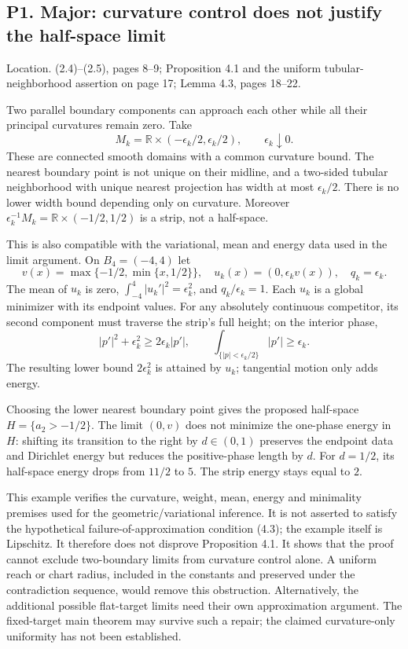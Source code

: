 \documentclass[10pt]{article}
\begin{document}
\subsection*{P1. Major: curvature control does not justify the half-space limit}
Location. (2.4)–(2.5), pages 8–9; Proposition 4.1 and the uniform tubular-neighborhood assertion on page 17; Lemma 4.3, pages 18–22.\par
Two parallel boundary components can approach each other while all their principal curvatures remain zero. Take \[M_k=\mathbb R\times(-\epsilon_k/2,\epsilon_k/2),\qquad
 \epsilon_k\downarrow0 .\] These are connected smooth domains with a common curvature bound. The nearest boundary point is not unique on their midline, and a two-sided tubular neighborhood with unique nearest projection has width at most \(\epsilon_k/2\). There is no lower width bound depending only on curvature. Moreover \(\epsilon_k^{-1}M_k=\mathbb R\times(-1/2,1/2)\) is a strip, not a half-space.\par
This is also compatible with the variational, mean and energy data used in the limit argument. On \(B_4=(-4,4)\) let \[v(x)=\max\{-1/2,\min\{x,1/2\}\},\quad
 u_k(x)=(0,\epsilon_k v(x)),\quad q_k=\epsilon_k .\] The mean of \(u_k\) is zero, \(\int_{-4}^4|u_k'|^2=\epsilon_k^2\), and \(q_k/\epsilon_k=1\). Each \(u_k\) is a global minimizer with its endpoint values. For any absolutely continuous competitor, its second component must traverse the strip’s full height; on the interior phase, \[|p'|^2+\epsilon_k^2\ge2\epsilon_k|p'|,
 \qquad
 \int_{\{|p|<\epsilon_k/2\}}|p'|\ge\epsilon_k .\] The resulting lower bound \(2\epsilon_k^2\) is attained by \(u_k\); tangential motion only adds energy.\par
Choosing the lower nearest boundary point gives the proposed half-space \(H=\{a_2>-1/2\}\). The limit \((0,v)\) does not minimize the one-phase energy in \(H\): shifting its transition to the right by \(d\in(0,1)\) preserves the endpoint data and Dirichlet energy but reduces the positive-phase length by \(d\). For \(d=1/2\), its half-space energy drops from \(11/2\) to \(5\). The strip energy stays equal to \(2\).\par
This example verifies the curvature, weight, mean, energy and minimality premises used for the geometric/variational inference. It is not asserted to satisfy the hypothetical failure-of-approximation condition (4.3); the example itself is Lipschitz. It therefore does not disprove Proposition 4.1. It shows that the proof cannot exclude two-boundary limits from curvature control alone. A uniform reach or chart radius, included in the constants and preserved under the contradiction sequence, would remove this obstruction. Alternatively, the additional possible flat-target limits need their own approximation argument. The fixed-target main theorem may survive such a repair; the claimed curvature-only uniformity has not been established.\par
\end{document}
